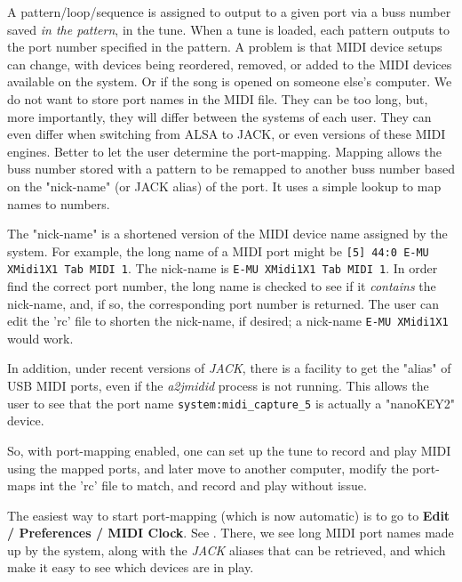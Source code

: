    A pattern/loop/sequence is assigned to output to a given port via
   a buss number saved \textsl{in the pattern}, in the tune.
   When a tune is loaded,
   each pattern outputs to the port number specified in the pattern.
   A problem is that MIDI device setups can change, with devices being
   reordered, removed, or added to the MIDI devices available on the system.
   Or if the song is opened on someone else's computer.
   We do not want to store port names in the MIDI file.
   They can be too long, but, more importantly,
   they will differ between the systems of each user.
   They can even differ when switching from ALSA to JACK, or even versions
   of these MIDI engines.
   Better to let the user determine the port-mapping.
   Mapping allows the buss number stored with a pattern to be
   remapped to another buss number based on the "nick-name"
   (or JACK alias) of the port.
   It uses a simple lookup to map names to numbers.

   The "nick-name" is a shortened version of the MIDI device name assigned
   by the system.
   For example, the long name of a MIDI port might be
   \texttt{[5] 44:0 E-MU XMidi1X1 Tab MIDI 1}.
   The nick-name is \texttt{E-MU XMidi1X1 Tab MIDI 1}.
   In order find the correct port number, the long name is checked to see if it
   \textsl{contains} the nick-name, and, if so, the corresponding port number is
   returned.  The user can edit the 'rc' file to shorten the nick-name, if
   desired; a nick-name \texttt{E-MU XMidi1X1} would work.

   In addition, under recent versions of \textsl{JACK},
   there is a facility to get the "alias" of USB MIDI ports,
   even if the \textsl{a2jmidid} process is not running.
   This allows the user to see that the port name
   \texttt{system:midi\_capture\_5} is actually a "nanoKEY2" device.

   So, with port-mapping enabled, one can set up the tune to record and play
   MIDI using the mapped ports, and later move to another computer, modify the
   port-maps int the 'rc' file to match, and record and play without issue.

   The easiest way to start port-mapping (which is now automatic) is to go to
   \textbf{Edit / Preferences / MIDI Clock}.
   See .
   There, we see long MIDI port names made up by the system, along
   with the \textsl{JACK} aliases that can be retrieved, and which make it easy
   to see which devices are in play.

\begin{comment}
\begin{figure}[H]
   \centering 
   \texttt{[image: main-menu/edit/preferences/midi\_clock\_pre\_portmap.png]}
   \caption{Clocks List Without Port Mapping}
   \label{fig:clocks_list_before_port_mapping}
\end{figure}

   Note the \texttt{system:midi\_playback} that is part of each port name.
   (There is a similar "capture" portion for input ports).
\end{comment}

